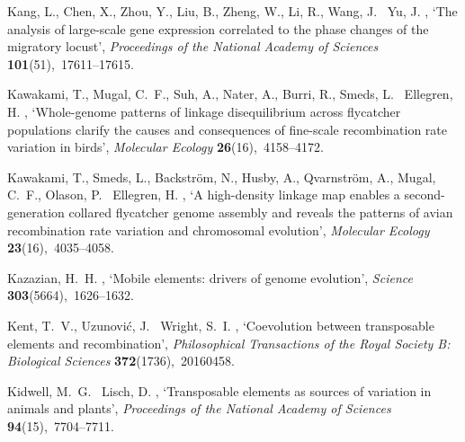 \documentclass[twocolumn]{bmcart}%
\begin{document}
\begin{backmatter}
\begin{thebibliography}{xx}
Kang, L., Chen, X., Zhou, Y., Liu, B., Zheng, W., Li, R., Wang, J. \harvardand\
  Yu, J.  \harvardyearright , `The analysis of large-scale
  gene expression correlated to the phase changes of the migratory locust',
  {\em Proceedings of the National Academy of Sciences} {\bf
  101}(51),~17611--17615.

Kawakami, T., Mugal, C.~F., Suh, A., Nater, A., Burri, R., Smeds, L.
  \harvardand\ Ellegren, H.  \harvardyearleft 2017\harvardyearright ,
  `Whole-genome patterns of linkage disequilibrium across flycatcher
  populations clarify the causes and consequences of fine-scale recombination
  rate variation in birds', {\em Molecular Ecology} {\bf 26}(16),~4158--4172.

Kawakami, T., Smeds, L., Backström, N., Husby, A., Qvarnström, A., Mugal,
  C.~F., Olason, P. \harvardand\ Ellegren, H.  \harvardyearleft
  2014\harvardyearright , `A high-density linkage map enables a
  second-generation collared flycatcher genome assembly and reveals the
  patterns of avian recombination rate variation and chromosomal evolution',
  {\em Molecular Ecology} {\bf 23}(16),~4035--4058.

Kazazian, H.~H.  \harvardyearright , `Mobile elements:
  drivers of genome evolution', {\em Science} {\bf 303}(5664),~1626--1632.

Kent, T.~V., Uzunović, J. \harvardand\ Wright, S.~I.  \harvardyearleft
  2017\harvardyearright , `Coevolution between transposable elements and
  recombination', {\em Philosophical Transactions of the Royal Society B:
  Biological Sciences} {\bf 372}(1736),~20160458.

Kidwell, M.~G. \harvardand\ Lisch, D.  \harvardyearright ,
  `Transposable elements as sources of variation in animals and plants', {\em
  Proceedings of the National Academy of Sciences} {\bf 94}(15),~7704--7711.


\end{thebibliography}
\end{backmatter}
\end{document}
